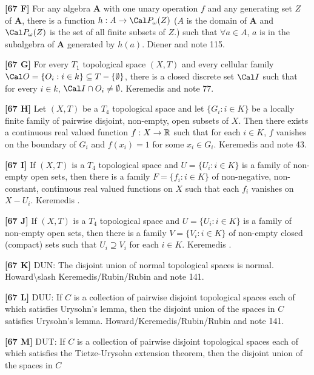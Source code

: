 \item{}{\bf [67 F]}  For any algebra {\bf A} with one unary operation $f$
and any generating set $Z$ of {\bf A}, there is
a function $h: A\to \Cal P_\omega(Z)$ ($A$ is the domain of {\bf A} and
$\Cal P_\omega(Z)$ is the set of all finite subsets of $Z$.) such that
$\forall a\in A$, $a$ is in the subalgebra of {\bf A} generated by
$h(a)$.  \ac{Diener} \cite{1989} and note 115.
\smallskip
\item{}{\bf [67 G]} For every $T_1$ topological space $(X,T)$ and every
cellular family $\Cal O=\{O_i: i\in k\}\subseteq T - \{\emptyset\}$,
there is a closed discrete set $\Cal I$ such that for every $i\in k$,
$\Cal I\cap O_i\ne\emptyset$. \ac{Keremedis} \cite{1998a} and note 77.
\smallskip
\item{}{\bf [67 H]} Let $(X, T)$ be a $T_4$ topological space and let
$\{G_i: i\in K\}$ be a locally finite family of pairwise disjoint,
non-empty, open subsets of $X$. Then there exists a continuous real
valued function $f: X\to \Bbb R$ such that for each $i\in K$, $f$ vanishes
on the boundary of $G_i$ and $f(x_i) = 1$ for some $x_i\in G_i$.
\ac{Keremedis} \cite{1997} and note 43.
\smallskip
\item{}{\bf [67 I]} If $(X,T)$ is a $T_4$ topological space and $U =
\{U_i: i\in K\}$ is a family of non-empty open sets, then there is a
family $F = \{f_i: i\in K\}$ of non-negative, non-constant,
continuous real valued functions on $X$ such that each $f_i$
vanishes on $X - U_i$. \ac{Keremedis} \cite{1997}.
\smallskip
\item{}{\bf [67 J]} If $(X,T)$ is a $T_4$ topological space and $U =
\{U_i: i\in K\}$ is a family of non-empty open sets, then there is a
family $V = \{V_i: i\in K\}$ of non-empty closed (compact) sets such
that $U_i \supseteq V_i$ for each $i\in K$.  \ac{Keremedis} \cite{1997}.
\smallskip
\item{}{\bf [67 K]} DUN: The disjoint union of normal topological
spaces is normal. \ac{Howard\slash Keremedis/Rubin/Rubin} \cite{1998a} and
note 141.
\smallskip
\item{}{\bf [67 L]} DUU: If $C$ is a collection of pairwise
disjoint topological spaces each of which satisfies Urysohn's
lemma, then the disjoint union of the spaces in $C$ satisfies
Urysohn's lemma.  \ac{Howard/Keremedis/Rubin/Rubin} \cite{1998a}
and note 141.
\smallskip
\item{}{\bf [67 M]} DUT:  If $C$ is a collection of pairwise
disjoint topological spaces each of which satisfies the Tietze-Urysohn
extension theorem, then the disjoint union of the spaces in $C$
